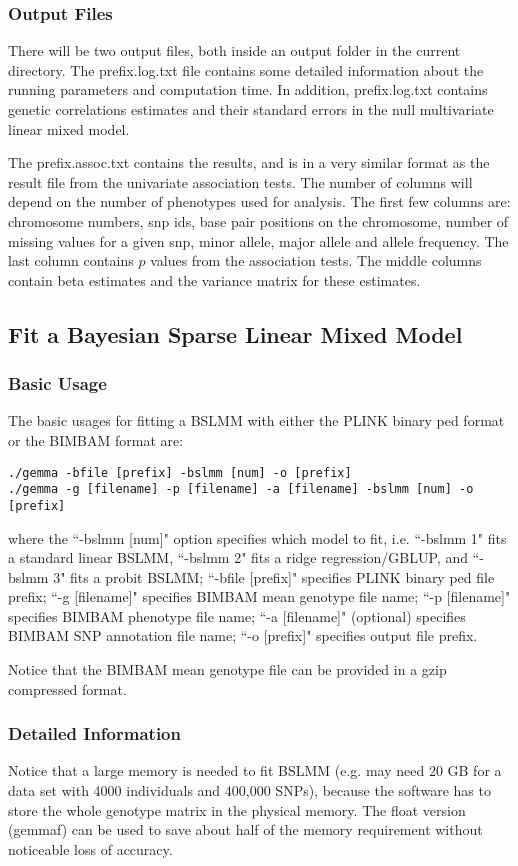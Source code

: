 \documentclass[11pt]{article}
\begin{document}
\subsubsection{Output Files}
There will be two output files, both inside an output folder in the current directory. The prefix.log.txt file contains some detailed information about the running parameters and computation time. In addition, prefix.log.txt contains genetic correlations estimates and their standard errors in the null multivariate linear mixed model.

The prefix.assoc.txt contains the results, and is in a very similar format as the result file from the univariate association tests. The number of columns will depend on the number of phenotypes used for analysis. The first few columns are: chromosome numbers, snp ids, base pair positions on the chromosome, number of missing values for a given snp, minor allele, major allele and allele frequency. The last column contains $p$ values from the association tests. The middle columns contain beta estimates and the variance matrix for these estimates. 



\subsection{Fit a Bayesian Sparse Linear Mixed Model}
\subsubsection{Basic Usage}
The basic usages for fitting a BSLMM with either the PLINK binary ped format or the BIMBAM format are:
\begin{verbatim}
./gemma -bfile [prefix] -bslmm [num] -o [prefix]
./gemma -g [filename] -p [filename] -a [filename] -bslmm [num] -o [prefix]
\end{verbatim}
where the ``-bslmm [num]" option specifies which model to fit, i.e. ``-bslmm 1" fits a standard linear BSLMM, ``-bslmm 2" fits a ridge regression/GBLUP, and ``-bslmm 3" fits a probit BSLMM; ``-bfile [prefix]" specifies PLINK binary ped file prefix; ``-g [filename]" specifies BIMBAM mean genotype file name; ``-p [filename]" specifies BIMBAM phenotype file name; ``-a [filename]" (optional) specifies BIMBAM SNP annotation file name; ``-o [prefix]" specifies output file prefix. 

Notice that the BIMBAM mean genotype file can be provided in a gzip compressed format.

\subsubsection{Detailed Information}
Notice that a large memory is needed to fit BSLMM (e.g. may need 20 GB for a data set with 4000 individuals and 400,000 SNPs), because the software has to store the whole genotype matrix in the physical memory. The float version (gemmaf) can be used to save about half of the memory requirement without noticeable loss of accuracy. 
\end{document}
